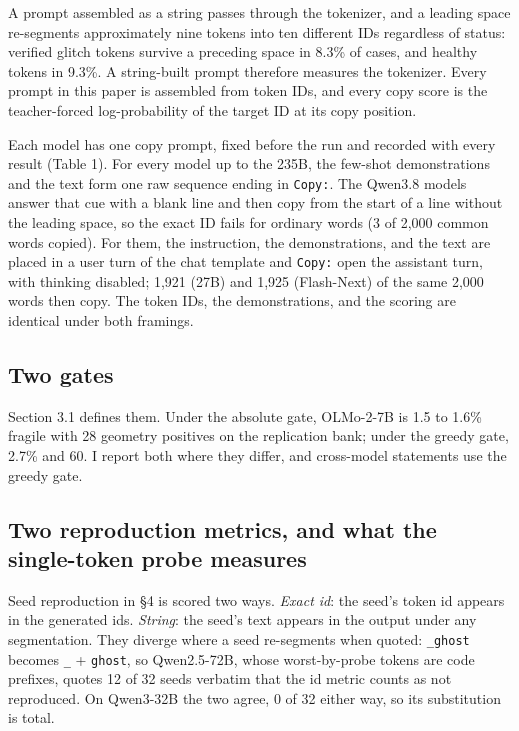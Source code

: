 \documentclass[11pt]{article}
\begin{document}
A prompt assembled as a string passes through the tokenizer, and a leading space re-segments approximately nine tokens into ten different IDs regardless of status: verified glitch tokens survive a preceding space in 8.3\% of cases, and healthy tokens in 9.3\%. A string-built prompt therefore measures the tokenizer. Every prompt in this paper is assembled from token IDs, and every copy score is the teacher-forced log-probability of the target ID at its copy position.

Each model has one copy prompt, fixed before the run and recorded with every result (Table 1). For every model up to the 235B, the few-shot demonstrations and the text form one raw sequence ending in \texttt{Copy:}. The Qwen3.8 models answer that cue with a blank line and then copy from the start of a line without the leading space, so the exact ID fails for ordinary words (3 of 2,000 common words copied). For them, the instruction, the demonstrations, and the text are placed in a user turn of the chat template and \texttt{Copy:} open the assistant turn, with thinking disabled; 1,921 (27B) and 1,925 (Flash-Next) of the same 2,000 words then copy. The token IDs, the demonstrations, and the scoring are identical under both framings.

\subsection{Two gates}\label{two-gates}

Section 3.1 defines them. Under the absolute gate, OLMo-2-7B is 1.5 to 1.6\% fragile with 28 geometry positives on the replication bank; under the greedy gate, 2.7\% and 60. I report both where they differ, and cross-model statements use the greedy gate.

\subsection{Two reproduction metrics, and what the single-token probe measures}\label{two-reproduction-metrics-and-what-the-single-token-probe-measures}

Seed reproduction in §4 is scored two ways. \emph{Exact id}: the seed's token id appears in the generated ids. \emph{String}: the seed's text appears in the output under any segmentation. They diverge where a seed re-segments when quoted: \texttt{\_ghost} becomes \texttt{\_} + \texttt{ghost}, so Qwen2.5-72B, whose worst-by-probe tokens are code prefixes, quotes 12 of 32 seeds verbatim that the id metric counts as not reproduced. On Qwen3-32B the two agree, 0 of 32 either way, so its substitution is total.
\end{document}
